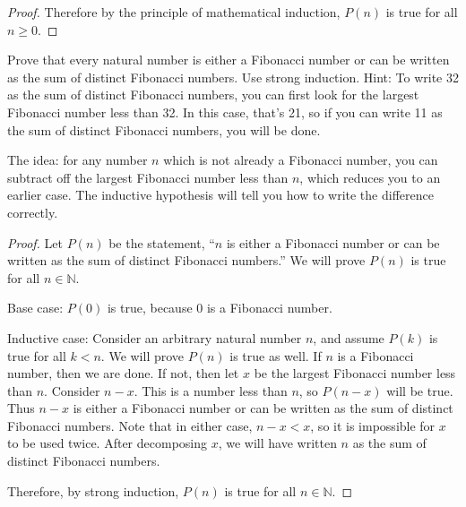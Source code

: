 \documentclass[11pt]{exam}
\def\N{\mathbb N}
\begin{document}
\begin{questions}
\begin{solution}
\begin{proof}
    Therefore by the principle of mathematical induction, $P(n)$ is true for all $n \ge 0$.
  \end{proof}

\end{solution}


\question[6] Prove that every natural number is either a Fibonacci number or can be written as the sum of distinct Fibonacci numbers.  Use strong induction.  Hint: To write 32 as the sum of distinct Fibonacci numbers, you can first look for the largest Fibonacci number less than 32.  In this case, that's 21, so if you can write 11 as the sum of distinct Fibonacci numbers, you will be done.

\begin{solution}
	The idea: for any number $n$ which is not already a Fibonacci number, you can subtract off the largest Fibonacci number less than $n$, which reduces you to an earlier case.  The inductive hypothesis will tell you how to write the difference correctly.
	
	\begin{proof}
		Let $P(n)$ be the statement, ``$n$ is either a Fibonacci number or can be written as the sum of distinct Fibonacci numbers.''  We will prove $P(n)$ is true for all $n \in \N$.
		
		Base case: $P(0)$ is true, because $0$ is a Fibonacci number.
		
		Inductive case: Consider an arbitrary natural number $n$, and assume $P(k)$ is true for all $k < n$.  We will prove $P(n)$ is true as well.  If $n$ is a Fibonacci number, then we are done.  If not, then let $x$ be the largest Fibonacci number less than $n$.  Consider $n-x$.  This is a number less than $n$, so $P(n-x)$ will be true.  Thus $n-x$ is either a Fibonacci number or can be written as the sum of distinct Fibonacci numbers.  Note that in either case, $n-x < x$, so it is impossible for $x$ to be used twice. After decomposing $x$, we will have written $n$ as the sum of distinct Fibonacci numbers.
		
		Therefore, by strong induction, $P(n)$ is true for all $n \in \N$.
	\end{proof} 
\end{solution}
\end{questions}
\end{document}
